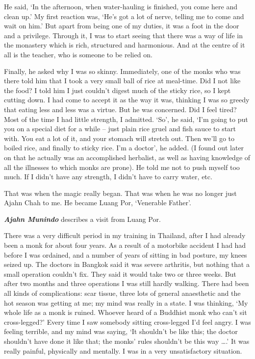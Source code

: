 He said, `In the afternoon, when water-hauling is finished, you come
here and clean up.' My first reaction was, `He's got a lot of nerve,
telling me to come and wait on him.' But apart from being one of my
duties, it was a foot in the door and a privilege. Through it, I was to
start seeing that there was a way of life in the monastery which is
rich, structured and harmonious. And at the centre of it all is the
teacher, who is someone to be relied on.

Finally, he asked why I was so skinny. Immediately, one of the monks who
was there told him that I took a very small ball of rice at meal-time.
Did I not like the food? I told him I just couldn't digest much of the
sticky rice, so I kept cutting down. I had come to accept it as the way
it was, thinking I was so greedy that eating less and less was a virtue.
But he was concerned. Did I feel tired? Most of the time I had little
strength, I admitted. `So', he said, `I'm going to put you on a special
diet for a while -- just plain rice gruel and fish sauce to start with.
You eat a lot of it, and your stomach will stretch out. Then we'll go to
boiled rice, and finally to sticky rice. I'm a doctor', he added. (I
found out later on that he actually was an accomplished herbalist, as
well as having knowledge of all the illnesses to which monks are prone).
He told me not to push myself too much. If I didn't have any strength, I
didn't have to carry water, etc.

That was when the magic really began. That was when he was no longer
just Ajahn Chah to me. He became Luang Por, `Venerable Father'.

\textbf{\emph{Ajahn Munindo}} describes a visit from Luang Por.

There was a very difficult period in my training in Thailand, after I
had already been a monk for about four years. As a result of a motorbike
accident I had had before I was ordained, and a number of years of
sitting in bad posture, my knees seized up. The doctors in Bangkok said
it was severe arthritis, but nothing that a small operation couldn't
fix. They said it would take two or three weeks. But after two months
and three operations I was still hardly walking. There had been all
kinds of complications: scar tissue, three lots of general anaesthetic
and the hot season was getting at me; my mind was really in a state. I
was thinking, `My whole life as a monk is ruined. Whoever heard of a
Buddhist monk who can't sit cross-legged?' Every time I saw somebody
sitting cross-legged I'd feel angry. I was feeling terrible, and my mind
was saying, `It shouldn't be like this; the doctor shouldn't have done
it like that; the monks' rules shouldn't be this way \ldots{}.' It was
really painful, physically and mentally. I was in a very unsatisfactory
situation.

